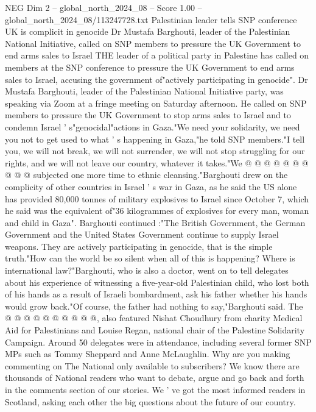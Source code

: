 \begin{textsample}{NEG Dim 2 – global\_north\_2024\_08 – Score 1.00 – global\_north\_2024\_08/113247728.txt}  \label{ex:f2_neg_355}
Palestinian leader tells SNP conference UK is complicit in genocide Dr Mustafa Barghouti, leader of the Palestinian National Initiative, called on SNP members to pressure the UK Government to end arms sales to Israel THE leader of a political party in Palestine has called on members at the SNP conference to pressure the UK Government to end arms sales to Israel, accusing the government of"actively participating in genocide".
Dr Mustafa Barghouti, leader of the Palestinian National Initiative party, was speaking via Zoom at a fringe meeting on Saturday afternoon.
He called on SNP members to pressure the UK Government to stop arms sales to Israel and to condemn Israel ' s"genocidal"actions in Gaza."We need your solidarity, we need you not to get used to what ' s happening in Gaza,"he told SNP members."I tell you, we will not break, we will not surrender, we will not stop struggling for our rights, and we will not leave our country, whatever it takes."We @ @ @ @ @ @ @ @ @ @ subjected one more time to ethnic cleansing."Barghouti drew on the complicity of other countries in Israel ' s war in Gaza, as he said the US alone has provided 80,000 tonnes of military explosives to Israel since October 7, which he said was the equivalent of"36 kilogrammes of explosives for every man, woman and child in Gaza".
Barghouti continued :"The British Government, the German Government and the United States Government continue to supply Israel weapons.
They are actively participating in genocide, that is the simple truth."How can the world be so silent when all of this is happening?
Where is international law?"Barghouti, who is also a doctor, went on to tell delegates about his experience of witnessing a five-year-old Palestinian child, who lost both of his hands as a result of Israeli bombardment, ask his father whether his hands would grow back."Of course, the father had nothing to say,"Barghouti said.
The @ @ @ @ @ @ @ @ @ @, also featured Nishat Choudhury from charity Medical Aid for Palestinians and Louise Regan, national chair of the Palestine Solidarity Campaign.
Around 50 delegates were in attendance, including several former SNP MPs such as Tommy Sheppard and Anne McLaughlin.
Why are you making commenting on The National only available to subscribers?
We know there are thousands of National readers who want to debate, argue and go back and forth in the comments section of our stories.
We ' ve got the most informed readers in Scotland, asking each other the big questions about the future of our country.

\end{textsample}
